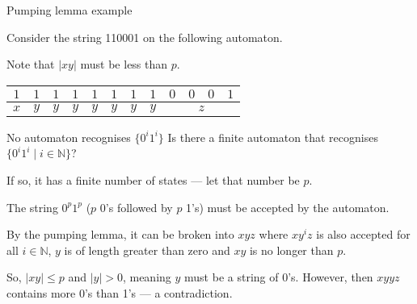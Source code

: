 \documentclass{beamer}
\begin{document}
  \begin{frame}[fragile]{Pumping lemma example}
  
    Consider the string 110001 on the following automaton.
  
    \begin{center}
    \end{center}
  
    Note that $|xy|$ must be less than $p$.
  
    \vspace{2mm}
    \pause
    \begin{table}
    \begin{tabular}{|c|c|c|c|c|c|c|c|cccc|}
      \hline
      $1$ & $1$ & $1$ & $1$ & $1$ & $1$ & $1$ & $1$ & $0$ & $0$ & $0$ & $1$ \\
      \hline
      $x$ & $y$ & $y$ & $y$ & $y$ & $y$ & $y$ & $y$ & \multicolumn{4}{c|}{$z$} \\
      \hline
    \end{tabular}
  \end{table}
  
  \end{frame}
  
  
  \begin{frame}{No automaton recognises $\{ 0^i 1^i \}$}
    \textcolor{gmitblue}{Is there a finite automaton that recognises $\{ 0^i 1^i \mid i \in \mathbb{N} \}$?}
    
    \vspace{4mm}
  
    If so, it has a finite number of states --- let that number be $p$.
  
    \vspace{2mm}
  
    The string $0^p1^p$ ($p$ 0's followed by $p$ 1's) must be accepted by the automaton.
  
    \vspace{2mm}
  
    By the pumping lemma, it can be broken into $xyz$ where $xy^iz$ is also accepted for all $i \in \mathbb{N}$, $y$ is of length greater than zero and $xy$ is no longer than $p$.
  
    \vspace{2mm}
  
    So, $|xy| \leq p$ and $|y| > 0$, meaning $y$ must be a string of 0's. However, then $xyyz$ contains more 0's than 1's --- a contradiction.
  
    
  \end{frame}
\end{document}

